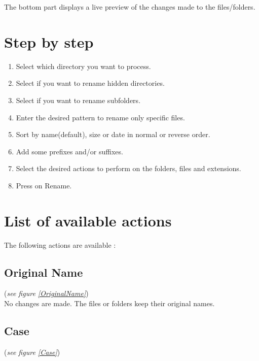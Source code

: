 \documentclass[11pt, a4paper]{scrartcl}
\begin{document}
The bottom part displays a live preview of the changes made to the files/folders.


\section{Step by step}
\begin{enumerate}
        \item Select which directory you want to process.
        \item Select if you want to rename hidden directories.
        \item Select if you want to rename subfolders.
        \item Enter the desired pattern to rename only specific files.
        \item Sort by name(default), size or date in normal or reverse order.
        \item Add some prefixes and/or suffixes.
        \item Select the desired actions to perform on the folders, files and extensions.
        \item Press on Rename.
\end{enumerate}

\section{List of available actions}
The following actions are available :

\subsection*{Original Name}
(\emph{see figure \ref{OriginalName}})\\

No changes are made. The files or folders keep their original names.

\subsection*{Case}
(\emph{see figure \ref{Case}})\\
\end{document}
